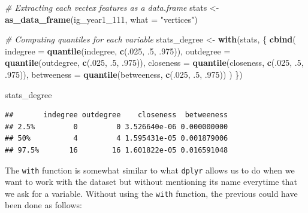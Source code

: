 \documentclass[]{book}
\newenvironment{Shaded}{\begin{snugshade}}{\end{snugshade}}
\newcommand{\KeywordTok}[1]{\textcolor[rgb]{0.13,0.29,0.53}{\textbf{#1}}}
\newcommand{\DataTypeTok}[1]{\textcolor[rgb]{0.13,0.29,0.53}{#1}}
\newcommand{\DecValTok}[1]{\textcolor[rgb]{0.00,0.00,0.81}{#1}}
\newcommand{\StringTok}[1]{\textcolor[rgb]{0.31,0.60,0.02}{#1}}
\newcommand{\CommentTok}[1]{\textcolor[rgb]{0.56,0.35,0.01}{\textit{#1}}}
\newcommand{\NormalTok}[1]{#1}
\theoremstyle{definition}
\theoremstyle{definition}
\theoremstyle{definition}
\theoremstyle{remark}
\begin{document}
\begin{Shaded}
\begin{Highlighting}[]
\CommentTok{# Extracting each vectex features as a data.frame}
\NormalTok{stats <-}\StringTok{ }\KeywordTok{as_data_frame}\NormalTok{(ig_year1_}\DecValTok{111}\NormalTok{, }\DataTypeTok{what =} \StringTok{"vertices"}\NormalTok{)}

\CommentTok{# Computing quantiles for each variable}
\NormalTok{stats_degree <-}\StringTok{ }\KeywordTok{with}\NormalTok{(stats, \{}
 \KeywordTok{cbind}\NormalTok{(}
   \DataTypeTok{indegree   =} \KeywordTok{quantile}\NormalTok{(indegree, }\KeywordTok{c}\NormalTok{(.}\DecValTok{025}\NormalTok{, .}\DecValTok{5}\NormalTok{, .}\DecValTok{975}\NormalTok{)),}
   \DataTypeTok{outdegree  =} \KeywordTok{quantile}\NormalTok{(outdegree, }\KeywordTok{c}\NormalTok{(.}\DecValTok{025}\NormalTok{, .}\DecValTok{5}\NormalTok{, .}\DecValTok{975}\NormalTok{)),}
   \DataTypeTok{closeness  =} \KeywordTok{quantile}\NormalTok{(closeness, }\KeywordTok{c}\NormalTok{(.}\DecValTok{025}\NormalTok{, .}\DecValTok{5}\NormalTok{, .}\DecValTok{975}\NormalTok{)),}
   \DataTypeTok{betweeness =} \KeywordTok{quantile}\NormalTok{(betweeness, }\KeywordTok{c}\NormalTok{(.}\DecValTok{025}\NormalTok{, .}\DecValTok{5}\NormalTok{, .}\DecValTok{975}\NormalTok{))}
\NormalTok{ )}
\NormalTok{\})}

\NormalTok{stats_degree}
\end{Highlighting}
\end{Shaded}

\begin{verbatim}
##       indegree outdegree    closeness  betweeness
## 2.5%         0         0 3.526640e-06 0.000000000
## 50%          4         4 1.595431e-05 0.001879006
## 97.5%       16        16 1.601822e-05 0.016591048
\end{verbatim}

The \texttt{with} function is somewhat similar to what \texttt{dplyr}
allows us to do when we want to work with the dataset but without
mentioning its name everytime that we ask for a variable. Without using
the \texttt{with} function, the previous could have been done as
follows:
\end{document}
